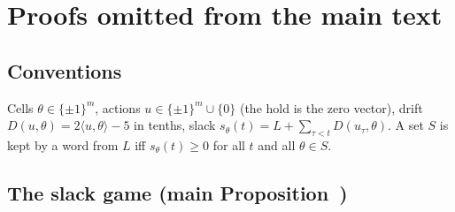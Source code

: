\section{Proofs omitted from the main text}\label{S:proofs}

\subsection{Conventions}
Cells $\theta\in\{\pm1\}^m$, actions $u\in\{\pm1\}^m\cup\{0\}$ (the hold is the zero vector), drift $D(u,\theta)=2\langle u,\theta\rangle-5$ in tenths, slack $s_\theta(t)=L+\sum_{\tau<t}D(u_\tau,\theta)$. A set $S$ is kept by a word from $L$ iff $s_\theta(t)\ge0$ for all $t$ and all $\theta\in S$.

\subsection{The slack game (main Proposition~)}
